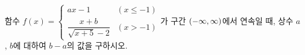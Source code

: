 함수 $f(x)=\begin{cases} ax-1 & (x\le -1) \\[1ex] \dfrac{x+b}{\sqrt{x+5}-2} & (x>-1) \end{cases}$가 구간 $(-\infty{,}\mkern3mu\mathopen{}\infty)$에서 연속일 때, 상수 $a$, $b$에 대하여 $b-a$의 값을 구하시오.
